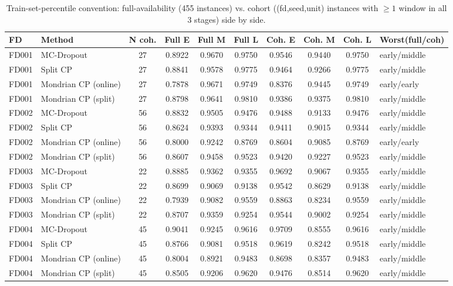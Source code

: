 \begin{table}[t]
\caption{Train-set-percentile convention: full-availability (455 instances) vs. cohort ((fd,seed,unit) instances with $\geq 1$ window in all 3 stages) side by side.}
\label{tab:trainpct-full-vs-cohort-v4}
\centering
\small
\begin{tabular}{llccccccc}
\toprule
FD & Method & N coh. & Full E & Full M & Full L & Coh. E & Coh. M & Coh. L & Worst(full/coh) \\
\midrule
FD001 & MC-Dropout & 27 & 0.8922 & 0.9670 & 0.9750 & 0.9546 & 0.9440 & 0.9750 & early/middle \\
FD001 & Split CP & 27 & 0.8841 & 0.9578 & 0.9775 & 0.9464 & 0.9266 & 0.9775 & early/middle \\
FD001 & Mondrian CP (online) & 27 & 0.7878 & 0.9671 & 0.9749 & 0.8376 & 0.9445 & 0.9749 & early/early \\
FD001 & Mondrian CP (split) & 27 & 0.8798 & 0.9641 & 0.9810 & 0.9386 & 0.9375 & 0.9810 & early/middle \\
FD002 & MC-Dropout & 56 & 0.8832 & 0.9505 & 0.9476 & 0.9488 & 0.9133 & 0.9476 & early/middle \\
FD002 & Split CP & 56 & 0.8624 & 0.9393 & 0.9344 & 0.9411 & 0.9015 & 0.9344 & early/middle \\
FD002 & Mondrian CP (online) & 56 & 0.8000 & 0.9242 & 0.8769 & 0.8604 & 0.9085 & 0.8769 & early/early \\
FD002 & Mondrian CP (split) & 56 & 0.8607 & 0.9458 & 0.9523 & 0.9420 & 0.9227 & 0.9523 & early/middle \\
FD003 & MC-Dropout & 22 & 0.8885 & 0.9362 & 0.9355 & 0.9692 & 0.9067 & 0.9355 & early/middle \\
FD003 & Split CP & 22 & 0.8699 & 0.9069 & 0.9138 & 0.9542 & 0.8629 & 0.9138 & early/middle \\
FD003 & Mondrian CP (online) & 22 & 0.7939 & 0.9082 & 0.9559 & 0.8863 & 0.8234 & 0.9559 & early/middle \\
FD003 & Mondrian CP (split) & 22 & 0.8707 & 0.9359 & 0.9254 & 0.9544 & 0.9002 & 0.9254 & early/middle \\
FD004 & MC-Dropout & 45 & 0.9041 & 0.9245 & 0.9616 & 0.9709 & 0.8555 & 0.9616 & early/middle \\
FD004 & Split CP & 45 & 0.8766 & 0.9081 & 0.9518 & 0.9619 & 0.8242 & 0.9518 & early/middle \\
FD004 & Mondrian CP (online) & 45 & 0.8004 & 0.8921 & 0.9483 & 0.8698 & 0.8357 & 0.9483 & early/middle \\
FD004 & Mondrian CP (split) & 45 & 0.8505 & 0.9206 & 0.9620 & 0.9476 & 0.8514 & 0.9620 & early/middle \\
\bottomrule
\end{tabular}
\end{table}
